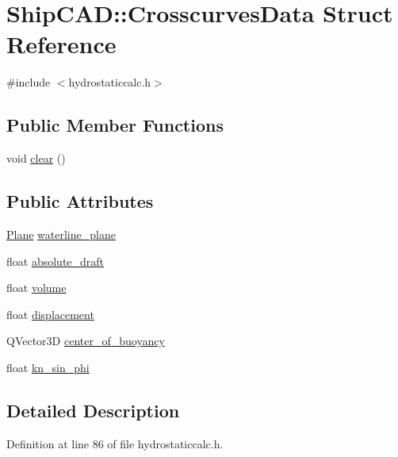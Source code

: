 \hypertarget{structShipCAD_1_1CrosscurvesData}{\section{Ship\-C\-A\-D\-:\-:Crosscurves\-Data Struct Reference}
\label{structShipCAD_1_1CrosscurvesData}
}


{\ttfamily \#include $<$hydrostaticcalc.\-h$>$}

\subsection*{Public Member Functions}
\begin{DoxyCompactItemize}
\item 
void \hyperlink{structShipCAD_1_1CrosscurvesData_a2fcb82c940ad6a13c07a25f44bbd5efd}{clear} ()
\end{DoxyCompactItemize}
\subsection*{Public Attributes}
\begin{DoxyCompactItemize}
\item 
\hyperlink{classShipCAD_1_1Plane}{Plane} \hyperlink{structShipCAD_1_1CrosscurvesData_a1ea6de1b52289e8392e8d499ae4aad04}{waterline\-\_\-plane}
\item 
float \hyperlink{structShipCAD_1_1CrosscurvesData_a759e5729cdb86d8367b139e66fecb7d3}{absolute\-\_\-draft}
\item 
float \hyperlink{structShipCAD_1_1CrosscurvesData_a9bec38a77bf87ab5feb76899e39e4f7b}{volume}
\item 
float \hyperlink{structShipCAD_1_1CrosscurvesData_a9a7baa66159e203888390eaa63caf708}{displacement}
\item 
Q\-Vector3\-D \hyperlink{structShipCAD_1_1CrosscurvesData_a0de723cd5ae0e18953fb7ad5a0f5dadf}{center\-\_\-of\-\_\-buoyancy}
\item 
float \hyperlink{structShipCAD_1_1CrosscurvesData_a55150860fed821e314e18b72f1975749}{kn\-\_\-sin\-\_\-phi}
\end{DoxyCompactItemize}


\subsection{Detailed Description}


Definition at line 86 of file hydrostaticcalc.\-h.



